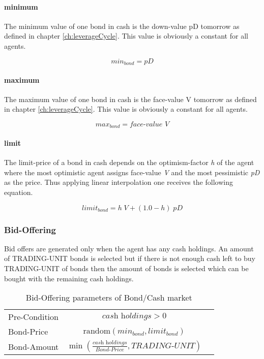 \documentclass[Bachelorarbeit.tex]{subfiles}
\begin{document}
\paragraph{minimum}
The minimum value of one bond in cash is the down-value pD tomorrow as defined in chapter \ref{ch:leverageCycle}. This value is obviously a constant for all agents.

\begin{equation}
min_{bond} = \textit{pD}
\end{equation}
 
\paragraph{maximum}
The maximum value of one bond in cash is the face-value V tomorrow as defined in chapter \ref{ch:leverageCycle}. This value is obviously a constant for all agents.

\begin{equation}
max_{bond} = \textit{face-value V}
\end{equation}

\paragraph{limit}
The limit-price of a bond in cash depends on the optimism-factor \textit{h} of the agent where the most optimistic agent assigns face-value \textit{V} and the most pessimistic \textit{pD} as the price. Thus applying linear interpolation one receives the following equation.

\begin{equation}
limit_{bond} = h \; V + ( 1.0 - h ) \; pD
\end{equation}

\subsubsection{Bid-Offering}
Bid offers are generated only when the agent has any cash holdings. An amount of TRADING-UNIT bonds is selected but if there is not enough cash left to buy TRADING-UNIT of bonds then the amount of bonds is selected which can be bought with the remaining cash holdings.

\begin{table}[H]
	\centering
	\caption{Bid-Offering parameters of Bond/Cash market}
	\begin{tabular} { l c r }
		\hline
		Pre-Condition & $\textit{cash holdings} > 0$  \\
		Bond-Price & $\mathrm{random}(min_{bond}, limit_{bond})$ \\
		Bond-Amount & $\min (\frac{\textit{cash holdings} }{ \textit{Bond-Price} }, \textit{TRADING-UNIT} )$ \\
		\hline
	\end{tabular}
\end{table}
\end{document}
